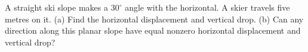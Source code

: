 A straight ski slope makes a $30^\circ$ angle with the horizontal. A skier travels five metres on it. (a) Find the horizontal displacement and vertical drop. (b) Can any direction along this planar slope have equal nonzero horizontal displacement and vertical drop?
